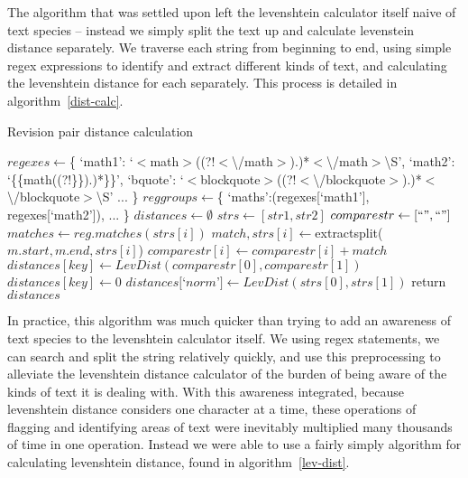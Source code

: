 The algorithm that was settled upon left the levenshtein calculator
itself naive of text species -- instead we simply split the text up
and calculate levenstein distance separately. We traverse each string
from beginning to end, using simple regex expressions to identify and
extract different kinds of text, and calculating the levenshtein
distance for each separately. This process is detailed in
algorithm~\ref{dist-calc}. 

\begin{algorithm}
  \caption{Revision pair distance calculation}\label{dist-calc}
  \begin{algorithmic}
    \State $regexes \gets $\{
    \Statex \tab`math1': `$<$math$>$((?!$<${\textbackslash}/math$>$).)*$<${\textbackslash}/math$>${\textbackslash}S',
    \Statex \tab`math2': `\{\{math((?!\}\}).)*\}\}',
    \Statex \tab`bquote': `$<$blockquote$>$((?!$<${\textbackslash}/blockquote$>$).)*$<${\textbackslash}/blockquote$>${\textbackslash}S'
    \Statex  \tab...
    \Statex\}
    \State $reggroups \gets $\{\label{dist-calc-groups}
    \Statex  \tab`maths':(regexes[`math1'], regexes[`math2']),
    \Statex  \tab...
    \Statex \}
    \State $distances \gets \emptyset$
    \State $strs \gets [str1, str2]$
    \State $comparestr \gets [``", ``"]$
    \State $matches \gets reg.matches(strs[i])$
    \State $match, strs[i] \gets $extractsplit($m.start, m.end, strs[i]$)
    \State $comparestr[i] \gets comparestr[i] + match$
    \EndFor
    \EndFor
    \State $distances[key] \gets LevDist(comparestr[0], comparestr[1])$ \label{mprocess-spawn}
    \Else
    \State $distances[key] \gets 0$
    \EndIf
    \EndFor
    \State $distances[$`$norm$'$] \gets LevDist(strs[0], strs[1])$
    \State return $distances$\label{mprocess-return}
    \EndFunction
  \end{algorithmic}
\end{algorithm}

In practice, this algorithm was much quicker than trying to add an
awareness of text species to the levenshtein calculator itself. We
using regex statements, we can search and split the string relatively
quickly, and use this preprocessing to alleviate the levenshtein
distance calculator of the burden of being aware of the kinds of text
it is dealing with. With this awareness integrated, because
levenshtein distance considers one character at a time, these
operations of flagging and identifying areas of text were inevitably
multiplied many thousands of time in one operation. Instead we were
able to use a fairly simply algorithm for calculating levenshtein
distance, found in algorithm~\ref{lev-dist}.

